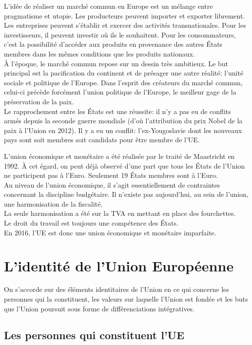 \documentclass[12pt, a4paper, openany]{book}
\begin{document}
L'idée de réaliser un marché commun en Europe est un mélange entre pragmatisme et utopie. Les producteurs peuvent importer et exporter librement. Les entreprises peuvent s'établir et exercer des activités transnationales. Pour les investisseurs, il peuvent investir où ils le souhaitent. Pour les consommateurs, c'est la possibilité d'accéder aux produits en provenance des autres États membres dans les mêmes conditions que les produits nationaux. \\
À l'époque, le marché commun repose sur un dessin très ambitieux. Le but principal est la pacification du continent et de présager une autre réalité: l'unité sociale et politique de l'Europe. Dans l'esprit des créateurs du marché commun, celui-ci précède forcément l'union politique de l'Europe, le meilleur gage de la préservation de la paix. \\
Le rapprochement entre les États est une réussite: il n'y a pas eu de conflits armés depuis la seconde guerre mondiale (d'où l'attribution du prix Nobel de la paix à l'Union en 2012). Il y a eu un conflit: l'ex-Yougoslavie dont les nouveaux pays sont soit membres soit candidats pour être membre de l'UE. 


L'union économique et monétaire a été réalisée par le traité de Maastricht en 1992. À cet égard, on peut déjà observé d'une part que tous les États de l'Union ne participent pas à l'Euro. Seulement 19 États membres sont à l'Euro. \\
Au niveau de l'union économique, il s'agit essentiellement de contraintes concernant la discipline budgétaire. Il n'existe pas aujourd'hui, au sein de l'union, une harmonisation de la fiscalité. \\
La seule harmonisation a été sur la TVA en mettant en place des fourchettes. \\
Le droit du travail est toujours une compétence des États.\\
En 2016, l'UE est donc une union économique et monétaire imparfaite. 


\part{L'identité de l'Union Européenne}

On s'accorde sur des éléments identitaires de l'Union en ce qui concerne les personnes qui la constituent, les valeurs sur laquelle l'Union est fondée et les buts que l'Union poursuit sous forme de différenciations intégratives.

\chapter{Les personnes qui constituent l'UE}
\end{document}

